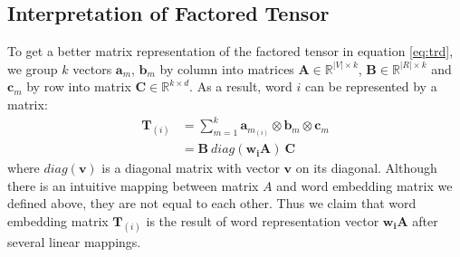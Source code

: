 \documentclass[a4paper]{article}
\begin{document}
\subsection{Interpretation of Factored Tensor} \label{sec:tf-expl}
To get a better matrix representation of the factored tensor in equation \eqref{eq:trd}, we group $k$ vectors $\mathbf{a}_m$, $\mathbf{b}_m$ by column into matrices $\mathbf{A} \in \mathbb{R}^{|V| \times k}$, $\mathbf{B} \in \mathbb{R}^{|R| \times k}$ and $\mathbf{c}_m$ by row into matrix $\mathbf{C} \in \mathbb{R}^{k \times d}$. As a result, word $i$ can be represented by a matrix: 
\begin{equation} \label{eq:we-tensor}
\begin{aligned}
    \mathbf{T}_{(i)}
        &= \sum_{m=1}^{k} \mathbf{a}_{m_{(i)}} \otimes \mathbf{b}_{m} \otimes \mathbf{c}_m \\
        &= \mathbf{B} \ diag(\mathbf{w_i}\mathbf{A}) \ \mathbf{C}
\end{aligned}
\end{equation}
where $diag(\mathbf{v})$ is a diagonal matrix with vector $\mathbf{v}$ on its diagonal. Although there is an intuitive mapping between matrix $A$ and word embedding matrix we defined above, they are not equal to each other. Thus we claim that word embedding matrix $\mathbf{T}_{(i)}$ is the result of word representation vector $\mathbf{w_i}\mathbf{A}$ after several linear mappings. 
\end{document}
